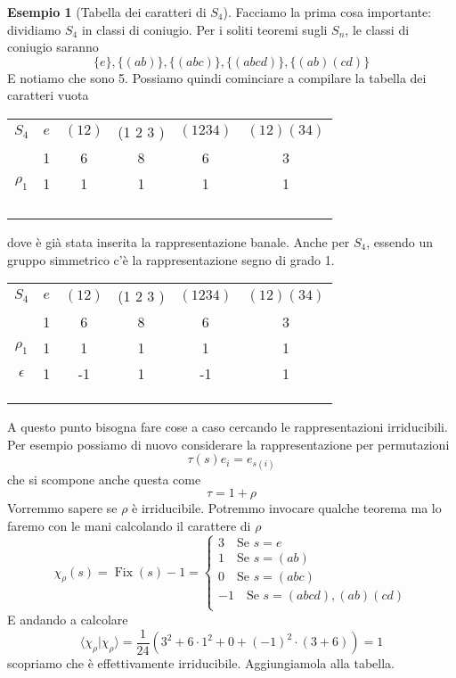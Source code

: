 \documentclass[11pt]{article}
\theoremstyle{plain}
\theoremstyle{definition}
\newtheorem{exmp}{Esempio}[section]
\theoremstyle{remark}
\DeclareMathOperator{\Fix}{Fix}
\begin{document}
\begin{exmp}[Tabella dei caratteri di $S_4$]
Facciamo la prima cosa importante: dividiamo $S_4$ in classi di coniugio. Per i soliti teoremi sugli $S_n$, le classi di coniugio saranno
\[\{e\}, \{(a b)\}, \{(a b c)\}, \{(a b c d)\}, \{(a b)(c d)\}\]
E notiamo che sono 5. Possiamo quindi cominciare a compilare la tabella dei caratteri vuota

\begin{table}[!ht]
\centering
\begin{tabular}{|c|c|c|c|c|c|}
\hline
$S_4$  & $e$ & $(1 2)$ & (1 2 3 ) & $(1 2 3 4)$ & $(1 2)(3 4)$ \\
 & 1 & 6 & 8 & 6 & 3 \\
\hline
 $\rho_1$ & 1 & 1  & 1 & 1 & 1\\
\hline
& &  & & & \\
\hline
& &  & & & \\
\hline
& &  & & & \\
\hline
& &  & & & \\
\hline
\end{tabular}
\end{table}

dove è già stata inserita la rappresentazione banale. Anche per $S_4$, essendo un gruppo simmetrico c'è la rappresentazione segno di grado 1.

\begin{table}[!ht]
\centering
\begin{tabular}{|c|c|c|c|c|c|}
\hline
$S_4$  & $e$ & $(1 2)$ & (1 2 3 ) & $(1 2 3 4)$ & $(1 2)(3 4)$ \\
 & 1 & 6 & 8 & 6 & 3 \\
\hline
 $\rho_1$ & 1 & 1  & 1 & 1 & 1\\
\hline
$\epsilon$ & 1  & -1 & 1 & -1 & 1 \\
\hline
& &  & & & \\
\hline
& &  & & & \\
\hline
& &  & & & \\
\hline
\end{tabular}
\end{table}

A questo punto bisogna fare cose a caso cercando le rappresentazioni irriducibili. Per esempio possiamo di nuovo considerare la rappresentazione per permutazioni
\[ \tau(s) e_i = e_{s(i)}\]
che si scompone anche questa come
\[ \tau = 1 + \rho\]
Vorremmo sapere se $\rho$ è irriducibile. Potremmo invocare qualche teorema ma lo faremo con le mani calcolando il carattere di $\rho$
\[ \chi_\rho(s) = \Fix(s) - 1 =
\begin{cases}
3 \quad \text{Se } s = e \\
1 \quad \text{Se } s = (a b) \\
0 \quad \text{Se } s = (a b c) \\
-1 \quad \text{Se } s = (a b c d ), (a b) (c d)\\
\end{cases}
\]
E andando a calcolare
\[\langle\chi_\rho |\chi_\rho\rangle = \dfrac{1}{24}\left(3^2  + 6 \cdot 1^2  + 0 + (-1)^2 \cdot (3 +6 )\right) = 1\]
scopriamo che è effettivamente irriducibile.  Aggiungiamola alla tabella.


\end{exmp}
\end{document}
